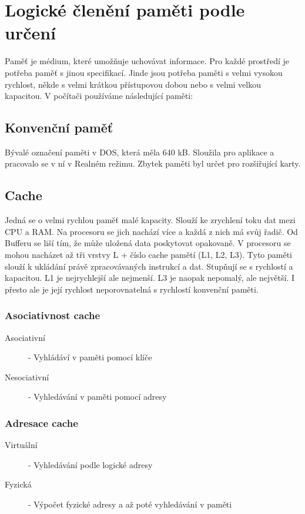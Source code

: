 \section{Logické členění paměti podle určení}
\label{sec:logicke-cleneni-pameti}
Paměť je médium, které umožňuje uchovávat informace.
Pro každé prostředí je potřeba paměť s jinou specifikací.
Jinde jsou potřeba paměti s velmi vysokou rychlost, někde s velmi krátkou přístupovou dobou nebo s velmi velkou kapacitou.
V počítači používáme následující paměti:
\subsection{Konvenční paměť}
Bývalé označení paměti v DOS, která měla 640 kB.
Sloužila pro aplikace a pracovalo se v ní v Realném režimu.
Zbytek paměti byl určet pro rozšiřující karty.
\subsection{Cache}
Jedná se o velmi rychlou paměť malé kapacity.
Slouží ke zrychlení toku dat mezi CPU a RAM.
Na procesoru se jich nachází více a každá z nich má svůj řadič.
Od Bufferu se liší tím, že může uložená data poskytovat opakovaně.
V procesoru se mohou nacházet až tři vrstvy L + číslo cache pamětí (L1, L2, L3).
Tyto paměti slouží k ukládání právě zpracovávaných instrukcí a dat.
Stupňují se s rychlostí a kapacitou.
L1 je nejrychlejší ale nejmenší.
L3 je naopak nepomalý, ale největší.
I přesto ale je její rychlost neporovnatelná s rychlostí konvenční paměti.
\subsubsection{Asociativnost cache}
\begin{description}
  \item[Asociativní]- Vyhládáví v paměti pomocí klíče
  \item[Nesociativní]-  Vyhledávání v paměti pomocí adresy
\end{description}
\subsubsection{Adresace cache}
\begin{description}
  \item[Virtuální]- Vyhledávání podle logické adresy
  \item[Fyzická]- Výpočet fyzické adresy a až poté vyhledávání v paměti
\end{description}
